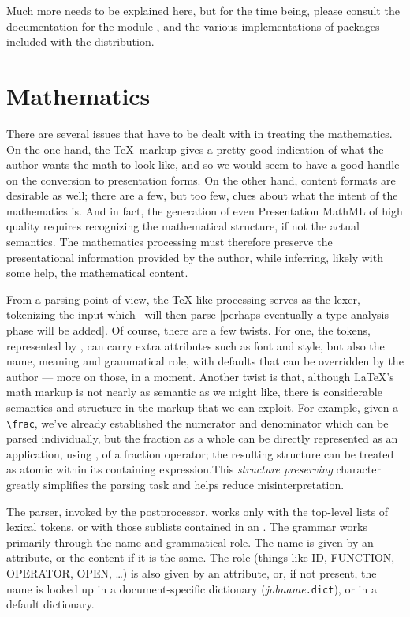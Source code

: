 \documentclass{report}
\begin{document}
Much more needs to be explained here, but for the time being,
please consult the documentation for the module , and
the various implementations of packages included with the distribution.

\chapter{Mathematics}\label{math}
There are several issues that have to be dealt with in treating the mathematics.
On the one hand, the \TeX\ markup gives a pretty good indication of what the
author wants the math to look like, and so we would seem to have a good handle
on the conversion to presentation forms.  On the other hand, content formats
are desirable as well; there are a few, but too few, clues about what the
intent of the mathematics is.  And in fact, the generation of even Presentation
MathML of high quality requires recognizing the mathematical structure, if not
the actual semantics. The mathematics processing must therefore preserve the
presentational information provided by the author, while inferring, likely
with some help, the mathematical content.

From a parsing point of view, the \TeX-like processing serves as the lexer,
tokenizing the input which \LaTeXML\ will then parse
[perhaps eventually a type-analysis phase will be added].
Of course, there are a few twists.
For one, the tokens, represented by , can carry extra attributes
such as font and style, but also the name, meaning and grammatical role,
with defaults that can be overridden by the author --- more on those, in a moment.
Another twist is that, although \LaTeX's math markup is not nearly
as semantic as we might like, there is considerable semantics and structure in the 
markup that we can exploit. For example, given a \verb|\frac|, we've already
established the numerator and denominator which can be parsed individually,
but the fraction as a whole can be directly represented as an application,
using , of a fraction operator; the resulting structure can be treated
as atomic within its containing expression.This \emph{structure preserving} character
greatly simplifies the parsing task and helps reduce misinterpretation.

The parser, invoked by the postprocessor, works only with the top-level lists of lexical tokens,
or with those sublists contained in an .  The grammar works primarily through
the name and grammatical role.  The name is given by an attribute, or the content if it is
the same.  The role (things like ID, FUNCTION, OPERATOR, OPEN, \ldots) is also given
by an attribute, or, if not present, the name is looked up in a document-specific
dictionary (\textit{jobname}\texttt{.dict}), or in a default dictionary.
\end{document}
